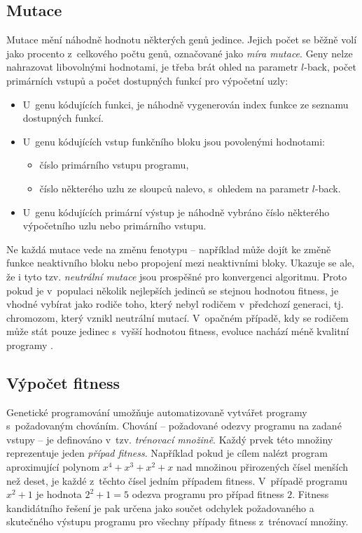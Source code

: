 \subsection{Mutace}

Mutace mění náhodně hodnotu některých genů jedince. Jejich počet se běžně volí jako procento z~celkového počtu genů, označované jako \emph{míra mutace}. Geny nelze nahrazovat libovolnými hodnotami, je třeba brát ohled na parametr $l$-back, počet primárních vstupů a počet dostupných funkcí pro výpočetní uzly:

\begin{itemize}
    \item U~genu kódujících funkci, je náhodně vygenerován index funkce ze seznamu dostupných funkcí.
    \item U~genu kódujících vstup funkčního bloku jsou povolenými hodnotami:
        \begin{itemize}
            \item číslo primárního vstupu programu,
            \item číslo některého uzlu ze sloupců nalevo, s~ohledem na parametr $l$-back.
        \end{itemize}
    \item U~genu kódujících primární výstup je náhodně vybráno číslo některého výpočetního uzlu nebo primárního vstupu.
\end{itemize}

Ne každá mutace vede na změnu fenotypu -- například může dojít ke změně funkce neaktivního bloku nebo propojení mezi neaktivními bloky. Ukazuje se ale, že i tyto tzv. \emph{neutrální mutace} jsou prospěšné pro konvergenci algoritmu. Proto pokud je v~populaci několik nejlepších jedinců se stejnou hodnotou fitness, je vhodné vybírat jako rodiče toho, který nebyl rodičem v~předchozí generaci, tj. chromozom, který vznikl neutrální mutací. V~opačném případě, kdy se rodičem může stát pouze jedinec s~vyšší hodnotou fitness, evoluce nachází méně kvalitní programy \cite{ZelenaCGP, Modra}.

\subsection{Výpočet fitness}
\label{secFitnessCalc}

Genetické programování umožňuje automatizovaně vytvářet programy s~požadovaným chováním. Chování -- požadované odezvy programu na zadané vstupy -- je definováno v~tzv. \emph{trénovací množině}. Každý prvek této množiny reprezentuje jeden \emph{případ fitness}. Například pokud je cílem nalézt program aproximující polynom $x^4 + x^3 + x^2 +x$ nad množinou přirozených čísel menších než deset, je každé z~těchto čísel jedním případem fitness. V~případě programu $x^2 + 1$ je hodnota $2^2 + 1 = 5$ odezva programu pro případ fitness $2$. Fitness kandidátního řešení je pak určena jako součet odchylek požadovaného a skutečného výstupu programu pro všechny případy fitness z~trénovací množiny.


